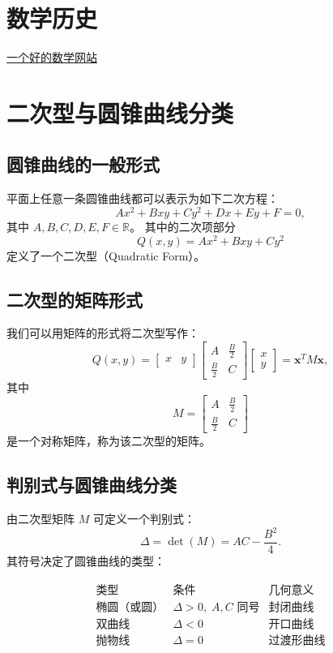 \documentclass{article}
\begin{document}
\section{数学历史}

\href{https://mathshistory.st-andrews.ac.uk/}{一个好的数学网站}

\section{二次型与圆锥曲线分类}

\subsection{圆锥曲线的一般形式}

平面上任意一条圆锥曲线都可以表示为如下二次方程：
\[
Ax^2 + Bxy + Cy^2 + Dx + Ey + F = 0,
\]
其中 \(A,B,C,D,E,F \in \mathbb{R}\)。  
其中的二次项部分
\[
Q(x, y) = Ax^2 + Bxy + Cy^2
\]
定义了一个二次型（Quadratic Form）。


\subsection{二次型的矩阵形式}

我们可以用矩阵的形式将二次型写作：
\[
Q(x, y) =
\begin{bmatrix}
	x & y
\end{bmatrix}
\begin{bmatrix}
	A & \tfrac{B}{2} \\
	\tfrac{B}{2} & C
\end{bmatrix}
\begin{bmatrix}
	x \\ y
\end{bmatrix}
= \mathbf{x}^T M \mathbf{x},
\]
其中
\[
M =
\begin{bmatrix}
	A & \tfrac{B}{2} \\
	\tfrac{B}{2} & C
\end{bmatrix}
\]
是一个对称矩阵，称为该二次型的矩阵。


\subsection{判别式与圆锥曲线分类}

由二次型矩阵 \(M\) 可定义一个判别式：
\[
\Delta = \det(M) = AC - \frac{B^2}{4}.
\]
其符号决定了圆锥曲线的类型：

\[
\begin{array}{c|c|c}
	\text{类型} & \text{条件} & \text{几何意义} \\ \hline
	\text{椭圆（或圆）} & \Delta > 0,\; A,C\text{ 同号} & \text{封闭曲线} \\
	\text{双曲线} & \Delta < 0 & \text{开口曲线} \\
	\text{抛物线} & \Delta = 0 & \text{过渡形曲线}
\end{array}
\]
\end{document}

